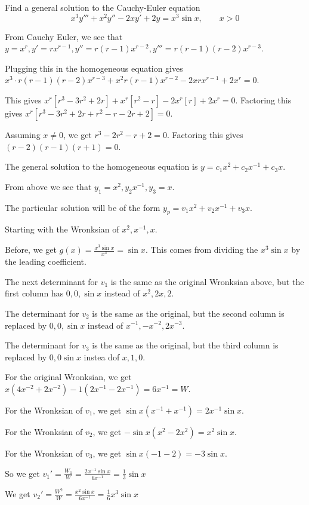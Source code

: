 \documentclass[../diffeq.tex]{subfiles}
\begin{document}
\begin{example}
    Find a general solution to the Cauchy-Euler equation 
    \[ x^3y'''+x^2y''-2xy'+2y=x^3\sin x, \qquad x>0 \]

    From Cauchy Euler, we see that $y=x^r, y'=rx^{r-1}, y''=r(r-1)x^{r-2}, y'''=r(r-1)(r-2)x^{r-3}$.

    Plugging this in the homogeneous equation gives $x^3\cdot r(r-1)(r-2)x^{r-3}+x^2r(r-1)x^{r-2}-2xrx^{r-1}+2x^r=0$.

    This gives $x^r[r^3-3r^2+2r]+x^r[r^2-r]-2x^r[r]+2x^r=0$. Factoring this gives $x^r[r^3-3r^2+2r+r^2-r-2r+2]=0$.

    Assuming $x\neq 0$, we get $r^3-2r^2-r+2=0$. Factoring this gives $(r-2)(r-1)(r+1)=0$.

    The general solution to the homogeneous equation is $y=c_1x^2+c_2x^{-1}+c_3x$.

    From above we see that $y_1=x^2,y_2x^{-1},y_3=x$.

    The particular solution will be of the form $y_p=v_1x^2+v_2x^{-1}+v_3x$.

    Starting with the Wronksian of $x^2,x^{-1},x$. 

    Before, we get $g(x)=\frac{x^3\sin x}{x^3}=\sin x$. This comes from dividing the $x^3\sin x$ by the leading coefficient.

    The next determinant for $v_1$ is the same as the original Wronksian above, but the first column has $0,0,\sin x$ instead of $x^2,2x,2$.

    The determinant for $v_2$ is the same as the original, but the second column is replaced by $0,0,\sin x$ instead of $x^{-1},-x^{-2},2x^{-3}$.

    The determinant for $v_3$ is the same as the original, but the third column is replaced by $0,0\sin x$ instea dof $x,1,0$.

    For the original Wronksian, we get $x(4x^{-2}+2x^{-2})-1(2x^{-1}-2x^{-1})=6x^{-1} = W$.

    For the Wronksian of $v_1$, we get $\sin x (x^{-1}+x^{-1})=2x^{-1}\sin x$.

    For the Wronksian of $v_2$, we get $-\sin x(x^2-2x^2)=x^2\sin x$.

    For the Wronksian of $v_3$, we get $\sin x(-1-2)=-3\sin x$.

    So we get $v_1'=\frac{W_1}{W}=\frac{2x^{-1}\sin x}{6x^{-1}}=\frac{1}{3}\sin x$

    We get $v_2'=\frac{W^2}{W}=\frac{x^2\sin x}{6x^{-1}}=\frac{1}{6}x^3\sin x$


\end{example}
\end{document}
